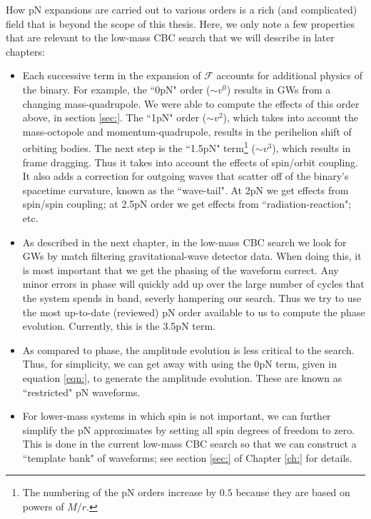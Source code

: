 How \ac{pN} expansions are carried out to various orders is a rich (and complicated) field that is beyond the scope of this thesis. Here, we only note a few properties that are relevant to the low-mass \ac{CBC} search that we will describe in later chapters:
\begin{itemize}
\item{Each successive term in the expansion of $\mathcal{F}$ accounts for additional physics of the binary. For example, the ``0\ac{pN}" order ($\sim v^0$) results in \acp{GW} from a changing mass-quadrupole. We were able to compute the effects of this order above, in section \ref{sec:}. The ``1\ac{pN}" order ($\sim v^2$), which takes into account the mass-octopole and momentum-quadrupole, results in the perihelion shift of orbiting bodies. The next step is the ``1.5\ac{pN}" term\footnote{The numbering of the \ac{pN} orders increase by $0.5$ because they are based on powers of $M/r$.} ($\sim v^3$), which results in frame dragging. Thus it takes into account the effects of spin/orbit coupling. It also adds a correction for outgoing waves that scatter off of the binary's spacetime curvature, known as the ``wave-tail". At 2\ac{pN} we get effects from spin/spin coupling; at 2.5\ac{pN} order we get effects from ``radiation-reaction"; etc.}
\item{As described in the next chapter, in the low-mass \ac{CBC} search we look for \acp{GW} by match filtering gravitational-wave detector data. When doing this, it is most important that we get the phasing of the waveform correct. Any minor errors in phase will quickly add up over the large number of cycles that the system spends in band, severly hampering our search. Thus we try to use the most up-to-date (reviewed) \ac{pN} order available to us to compute the phase evolution. Currently, this is the 3.5\ac{pN} term.}
\item{As compared to phase, the amplitude evolution is less critical to the search. Thus, for simplicity, we can get away with using the 0\ac{pN} term, given in equation \ref{eqn:}, to generate the amplitude evolution. These are known as ``restricted" \ac{pN} waveforms.}
\item{For lower-mass systems in which spin is not important, we can further simplify the \ac{pN} approximates by setting all spin degrees of freedom to zero. This is done in the current low-mass \ac{CBC} search so that we can construct a ``template bank" of waveforms; see section \ref{sec:} of Chapter \ref{ch:} for details.}
\end{itemize}

